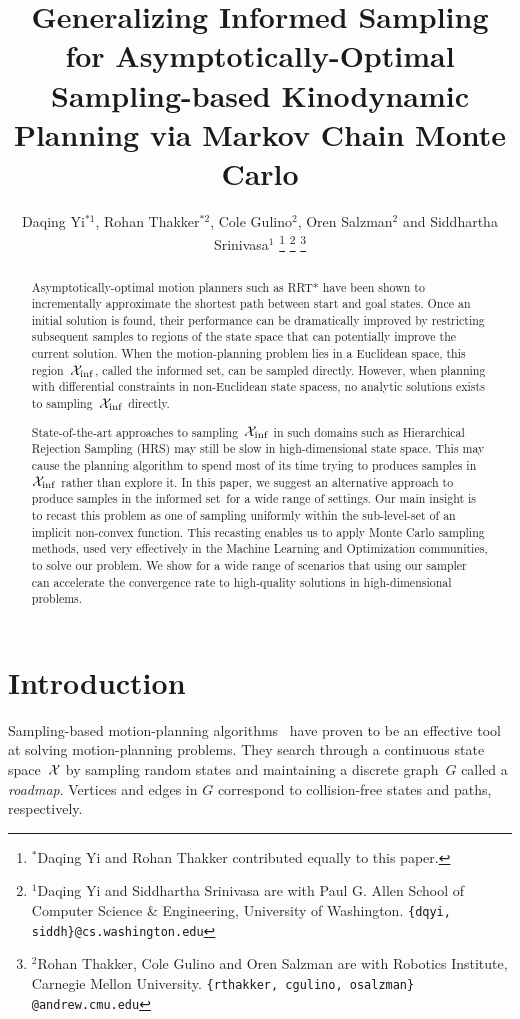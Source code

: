 \documentclass[letterpaper, 10 pt, conference]{ieeeconf}  %
\title{\LARGE \bf
Generalizing Informed Sampling
for Asymptotically-Optimal Sampling-based Kinodynamic Planning via Markov Chain
Monte Carlo
}
\author{
Daqing Yi$^{*1}$,
Rohan Thakker$^{*2}$,
Cole Gulino$^{2}$, 
Oren Salzman$^{2}$ and
Siddhartha Srinivasa$^{1}$
\thanks{$^{*}$Daqing Yi and Rohan Thakker contributed equally to this paper.}
\thanks{$^{1}$Daqing Yi and Siddhartha Srinivasa are with Paul G. Allen School of Computer Science \& Engineering, University of Washington.
{\tt\small \{dqyi, siddh\}@cs.washington.edu}}
\thanks{$^{2}$Rohan Thakker, Cole Gulino and Oren Salzman are with Robotics Institute, Carnegie Mellon University.
{\tt\small \{rthakker, cgulino, osalzman\} @andrew.cmu.edu}}%
}
\begin{document}
\maketitle
\thispagestyle{empty}
\pagestyle{empty}


\begin{abstract}
Asymptotically-optimal motion planners such as RRT* have been shown to incrementally approximate the shortest path between start and goal states.
Once an initial solution is found, their performance can be dramatically improved by restricting subsequent samples to regions of the state space that can potentially improve the current solution.
When the motion-planning problem lies in a Euclidean space, this region~$\mathcal{X}_{\rm {inf}}$, called the informed set, can be sampled directly.
However, when planning with differential constraints in non-Euclidean state spacess, no analytic solutions exists to sampling~$\mathcal{X}_{\rm {inf}}$ directly.

State-of-the-art approaches to sampling~$\mathcal{X}_{\rm {inf}}$ in such domains such as Hierarchical Rejection Sampling (HRS) may still be slow in high-dimensional state space.
This may cause the planning algorithm to spend most of its time trying to produces samples in~$\mathcal{X}_{\rm {inf}}$ rather than explore it.
In this paper, we suggest an alternative approach to produce samples in the informed set~\Cinf for a wide range of settings.
Our main insight is to recast this problem as one of sampling uniformly within the sub-level-set of an implicit non-convex function.
This recasting enables us to apply Monte Carlo sampling methods, used very effectively in the Machine Learning and Optimization communities, to solve our problem.
We show for a wide range of scenarios that using our sampler can accelerate the convergence rate to high-quality solutions in high-dimensional problems.
\end{abstract}


\section{Introduction}
\label{sec:intro}


Sampling-based motion-planning algorithms~\cite{L06} have proven to be an effective tool at solving motion-planning problems.
They search through a continuous state space~$\mathcal{X}$ by sampling random states and maintaining a discrete graph~$G$ called a \emph{roadmap}.
Vertices and edges in $G$ correspond to collision-free states and paths, respectively.
\end{document}
